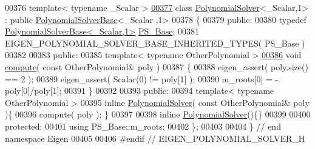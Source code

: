 \begin{DoxyCode}
00376 \textcolor{keyword}{template}< \textcolor{keyword}{typename} \_Scalar >
\hyperlink{class_eigen_1_1_polynomial_solver_3_01___scalar_00_011_01_4}{00377} \textcolor{keyword}{class }\hyperlink{class_eigen_1_1_polynomial_solver}{PolynomialSolver}<\_Scalar,1> : \textcolor{keyword}{public} \hyperlink{class_eigen_1_1_polynomial_solver_base}{PolynomialSolverBase}<\_Scalar
      ,1>
00378 \{
00379   \textcolor{keyword}{public}:
00380     \textcolor{keyword}{typedef} \hyperlink{class_eigen_1_1_polynomial_solver_base}{PolynomialSolverBase<\_Scalar,1>}    
      \hyperlink{class_eigen_1_1_polynomial_solver_base}{PS\_Base};
00381     EIGEN\_POLYNOMIAL\_SOLVER\_BASE\_INHERITED\_TYPES( PS\_Base )
00382 
00383   \textcolor{keyword}{public}:
00385     \textcolor{keyword}{template}< \textcolor{keyword}{typename} OtherPolynomial >
\hyperlink{class_eigen_1_1_polynomial_solver_3_01___scalar_00_011_01_4_ac10c32870abba4461d681506eaa63e18}{00386}     \textcolor{keywordtype}{void} \hyperlink{class_eigen_1_1_polynomial_solver_3_01___scalar_00_011_01_4_ac10c32870abba4461d681506eaa63e18}{compute}( \textcolor{keyword}{const} OtherPolynomial& poly )
00387     \{
00388       eigen\_assert( poly.size() == 2 );
00389       eigen\_assert( Scalar(0) != poly[1] );
00390       m\_roots[0] = -poly[0]/poly[1];
00391     \}
00392 
00393   \textcolor{keyword}{public}:
00394     \textcolor{keyword}{template}< \textcolor{keyword}{typename} OtherPolynomial >
00395     \textcolor{keyword}{inline} \hyperlink{class_eigen_1_1_polynomial_solver}{PolynomialSolver}( \textcolor{keyword}{const} OtherPolynomial& poly )\{
00396       compute( poly ); \}
00397 
00398     \textcolor{keyword}{inline} \hyperlink{class_eigen_1_1_polynomial_solver}{PolynomialSolver}()\{\}
00399 
00400   \textcolor{keyword}{protected}:
00401     \textcolor{keyword}{using}                   PS\_Base::m\_roots;
00402 \};
00403 
00404 \} \textcolor{comment}{// end namespace Eigen}
00405 
00406 \textcolor{preprocessor}{#endif // EIGEN\_POLYNOMIAL\_SOLVER\_H}
\end{DoxyCode}
